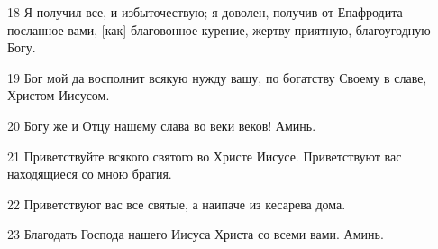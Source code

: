 \par 18 Я получил все, и избыточествую; я доволен, получив от Епафродита посланное вами, [как] благовонное курение, жертву приятную, благоугодную Богу.
\par 19 Бог мой да восполнит всякую нужду вашу, по богатству Своему в славе, Христом Иисусом.
\par 20 Богу же и Отцу нашему слава во веки веков! Аминь.
\par 21 Приветствуйте всякого святого во Христе Иисусе. Приветствуют вас находящиеся со мною братия.
\par 22 Приветствуют вас все святые, а наипаче из кесарева дома.
\par 23 Благодать Господа нашего Иисуса Христа со всеми вами. Аминь.


